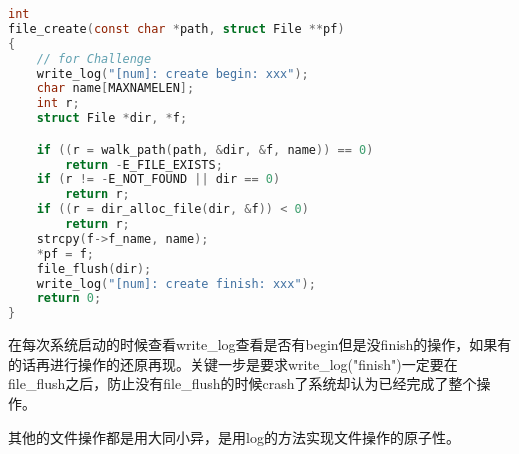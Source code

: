 \documentclass[11pt,a4paper]{article}
\begin{document}
\setmainfont{Consolas}
\begin{lstlisting}[language={C},firstnumber=1,title=fs/fs.c] 
int
file_create(const char *path, struct File **pf)
{
	// for Challenge
	write_log("[num]: create begin: xxx");
	char name[MAXNAMELEN];
	int r;
	struct File *dir, *f;

	if ((r = walk_path(path, &dir, &f, name)) == 0)
		return -E_FILE_EXISTS;
	if (r != -E_NOT_FOUND || dir == 0)
		return r;
	if ((r = dir_alloc_file(dir, &f)) < 0)
		return r;
	strcpy(f->f_name, name);
	*pf = f;
	file_flush(dir);
	write_log("[num]: create finish: xxx");
	return 0;
}
\end{lstlisting}
\setmainfont[BoldFont=黑体]{宋体}

在每次系统启动的时候查看write\_log查看是否有begin但是没finish的操作，如果有的话再进行操作的还原再现。关键一步是要求write\_log("finish")一定要在file\_flush之后，防止没有file\_flush的时候crash了系统却认为已经完成了整个操作。

其他的文件操作都是用大同小异，是用log的方法实现文件操作的原子性。
\end{document}
